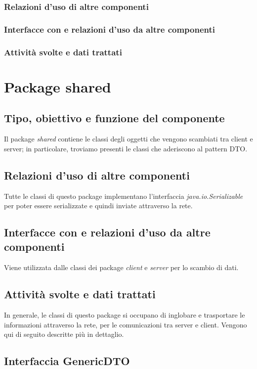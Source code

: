 \subsubsection*{Relazioni d'uso di altre componenti}
\subsubsection*{Interfacce con e relazioni d'uso da altre componenti}
\subsubsection*{Attivit\`a svolte e dati trattati}

\newpage
\section{Package shared} %
\subsection*{Tipo, obiettivo e funzione del componente}
Il package \textit{shared} contiene le classi degli oggetti che vengono
scambiati tra client e server; in particolare, troviamo presenti le classi che
aderiscono al pattern DTO.
\subsection*{Relazioni d'uso di altre componenti}
Tutte le classi di questo package implementano l'interfaccia
\textit{java.io.Serializable} per poter essere serializzate e quindi inviate
attraverso la rete. 
\subsection*{Interfacce con e relazioni d'uso da altre componenti}
Viene utilizzata dalle classi dei package \textit{client} e \textit{server} per
lo scambio di dati.
\subsection*{Attivit\`a svolte e dati trattati}
In generale, le classi di questo package si occupano di inglobare e trasportare
le informazioni attraverso la rete, per le comunicazioni tra server e client.
Vengono qui di seguito descritte pi\`u in dettaglio.

\subsection{Interfaccia GenericDTO}
